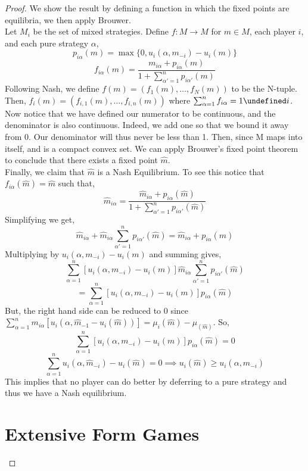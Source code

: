 \documentclass[dvips,11pt]{article}
\let\oldforall\forall
\let\forall\undefined
\DeclareMathOperator{\forall}{\,\oldforall\,}
\DeclareMathOperator{\?}{\,?\,}
\begin{document}
\begin{proof}
We show the result by defining a function in which the fixed points are equilibria, we then apply Brouwer. 
\\ Let $M_i$ be the set of mixed strategies. Define $f:M\rightarrow M$ for $m\in M$, each player $i$, and each pure strategy $\alpha$,
$$p_{i\alpha}(m) = \max\{0, u_i(\alpha,m_{-i})-u_i(m)\}$$
$$f_{i\alpha}(m) = \frac{m_{i\alpha}+p_{i\alpha}(m)}{1+\sum^n_{\alpha'=1}p_{i\alpha'}(m)}$$
Following Nash, we define $f(m) = (f_1(m),\dots,f_N(m))$ to be the N-tuple. Then, $f_{i}(m) = (f_{i,1}(m),\dots,f_{i,n}(m))$ where $\sum^n_{\alpha=1} f_{i\alpha} = 1 \forall i$.
\\ Now notice that we have defined our numerator to be continuous, and the denominator is also continuous. Indeed, we add one so that we bound it away from 0. Our denominator will thus never be less than 1. Then, since M maps into itself, and is a compact convex set. We can apply Brouwer's fixed point theorem to conclude that there exists a fixed point $\hat{m}$.
\\ Finally, we claim that $\hat{m}$ is a Nash Equilibrium. To see this notice that $f_{i\alpha}(\hat{m}) = \hat{m}$ such that,
$$\hat{m}_{i\alpha} = \frac{\hat{m}_{i\alpha} + p_{i\alpha}(\hat{m})}{1 + \sum^n_{\alpha'=1}p_{i\alpha'}(\hat{m})}$$
Simplifying we get,
$$\hat{m}_{i\alpha} + \hat{m}_{i\alpha}\sum^n_{\alpha'=1}p_{i\alpha'}(\hat{m}) = \hat{m}_{i\alpha} + p_{i\alpha}(\hat{m})$$
Multiplying by $u_i(\alpha,m_{-i})-u_i(m)$ and summing gives,
$$ \sum_{\alpha=1}^n[u_i(\alpha,m_{-i})-u_i(m)]\hat{m}_{i\alpha}\sum^n_{\alpha'=1}p_{i\alpha'}(\hat{m})$$$$ =  \sum^n_{\alpha=1}[u_i(\alpha,m_{-i})-u_i(m)]p_{i\alpha}(\hat{m})
$$
But, the right hand side can be reduced to 0 since $\sum^n_{\alpha=1}m_{i\alpha}[u_i(\alpha,\hat{m}_{-1}-u_i(\hat{m}))] = \mu_i(\hat{m})-\mu_(\hat{m})$.
So,
$$\sum^n_{\alpha=1}[u_i(\alpha,m_{-i})-u_i(m)]p_{i\alpha}(\hat{m}) = 0$$
$$\sum^n_{\alpha=1}u_i(\alpha,\hat{m}_{-i})-u_i(\hat{m}) = 0 \implies u_i(\hat{m})\geq u_i(\alpha, \hat{m}_{-i})$$
This implies that no player can do better by deferring to a pure strategy and thus we have a Nash equilibrium. 
\section{Extensive Form Games}
\end{proof} 
\end{document}
